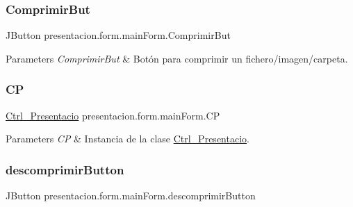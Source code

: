 \subsubsection{\texorpdfstring{Comprimir\+But}{ComprimirBut}}
{\footnotesize\ttfamily J\+Button presentacion.\+form.\+main\+Form.\+Comprimir\+But\hspace{0.3cm}{\ttfamily [private]}}


\begin{DoxyParams}{Parameters}
{\em Comprimir\+But} & Botón para comprimir un fichero/imagen/carpeta. \\
\hline
\end{DoxyParams}
\mbox{\label{classpresentacion_1_1form_1_1mainForm_a4d01396f002d4f9bd18db3877057c77b}} 
\subsubsection{\texorpdfstring{CP}{CP}}
{\footnotesize\ttfamily \hyperlink{classpresentacion_1_1Ctrl__Presentacio_1_1Ctrl__Presentacio}{Ctrl\+\_\+\+Presentacio} presentacion.\+form.\+main\+Form.\+CP\hspace{0.3cm}{\ttfamily [private]}}


\begin{DoxyParams}{Parameters}
{\em CP} & Instancia de la clase \hyperlink{namespacepresentacion_1_1Ctrl__Presentacio}{Ctrl\+\_\+\+Presentacio}. \\
\hline
\end{DoxyParams}
\mbox{\label{classpresentacion_1_1form_1_1mainForm_a336e6855f8a19241d02376d4ff6a1802}} 
\subsubsection{\texorpdfstring{descomprimir\+Button}{descomprimirButton}}
{\footnotesize\ttfamily J\+Button presentacion.\+form.\+main\+Form.\+descomprimir\+Button\hspace{0.3cm}{\ttfamily [private]}}



